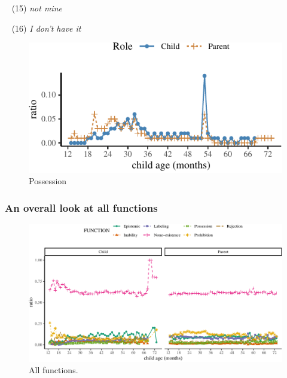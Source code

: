 \documentclass[10pt, letterpaper]{article}
\newenvironment{CodeChunk}{}{}
\begin{document}
~ (15) \emph{not mine}

~ (16) \emph{I don't have it}

\begin{CodeChunk}
\begin{figure}[H]

{\centering \includegraphics{figs/possession-1} 

}

\caption[Possession]{Possession}\label{fig:possession}
\end{figure}
\end{CodeChunk}

\hypertarget{an-overall-look-at-all-functions}{%
\subsubsection{An overall look at all
functions}\label{an-overall-look-at-all-functions}}

\begin{figure}[h]
\begin{CodeChunk}


\begin{center}\includegraphics{figs/all-1} \end{center}

\end{CodeChunk}
\caption[This image spans both columns]{All functions.}\label{fig:all}
\end{figure}
\end{document}

